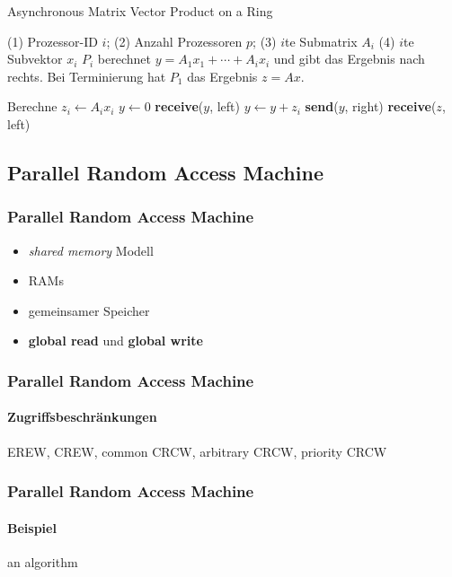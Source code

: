 \begin{frame}
    \begin{algorithm}[H]
        \caption{Asynchronous Matrix Vector Product on a Ring \cite[S.18]{jaja}}
        \begin{algorithmic}[1]
        \Require (1) Prozessor-ID $i$; (2) Anzahl Prozessoren $p$;
        (3) $i$te Submatrix $A_i$
        (4) $i$te Subvektor $x_i$
        \Ensure $P_i$ berechnet $y = A_1x_1 + \cdots + A_ix_i$
        und gibt das Ergebnis nach rechts. Bei Terminierung hat $P_1$ das
        Ergebnis $z = Ax$.
        \begin{multicols}{2}
            \State Berechne $z_i \gets A_ix_i$
                \State $y \gets 0$
            \Else
                \State \textbf{receive}($y$, left)
            \EndIf
            \State $y \gets y + z_i$
            \State \textbf{send}($y$, right)
                \State \textbf{receive}($z$, left)
            \EndIf
        \end{multicols}
        \end{algorithmic}
    \end{algorithm}
\end{frame}

\subsection{Parallel Random Access Machine}
\begin{frame}
    \frametitle{Parallel Random Access Machine}
    \begin{itemize}
        \item \emph{shared memory} Modell
        \item RAMs
        \item gemeinsamer Speicher
        \item \textbf{global read} und \textbf{global write}
    \end{itemize}
\end{frame}

\begin{frame}
    \frametitle{Parallel Random Access Machine}
    \framesubtitle{Zugriffsbeschränkungen}
    EREW, CREW, common CRCW, arbitrary CRCW, priority CRCW
\end{frame}

\begin{frame}
    \frametitle{Parallel Random Access Machine}
    \framesubtitle{Beispiel}
    an algorithm
\end{frame}
